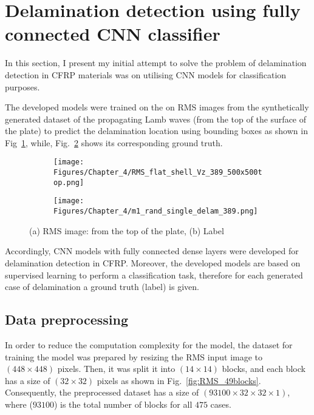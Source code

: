 \section{Delamination detection using fully connected CNN classifier}
\label{sec42}

In this section, I present my initial attempt to solve the problem of delamination detection in CFRP materials was on utilising CNN models for classification purposes.

The developed models were trained on the on RMS images from the synthetically generated dataset of the propagating Lamb waves (from the top of the surface of the plate) to predict the delamination location using bounding boxes as shown in Fig~\ref{fig:RMS_14}, while, Fig.~\ref{fig:label_14} shows its corresponding ground truth.
\begin{figure} [h!]
	\centering
	\begin{subfigure}[b]{0.47\textwidth}
		\centering
		\texttt{[image: Figures/Chapter\_4/RMS\_flat\_shell\_Vz\_389\_500x500top.png]}
		\caption{}
		\label{fig:RMS_14}
	\end{subfigure}
	\hfill
	\begin{subfigure}[b]{0.47\textwidth}
		\centering
		\texttt{[image: Figures/Chapter\_4/m1\_rand\_single\_delam\_389.png]}
		\caption{}
		\label{fig:label_14}
	\end{subfigure}
	\caption{(a) RMS image: from the top of the plate, (b) Label}
	\label{fig:RMS_GT}
\end{figure} 

Accordingly, CNN models with fully connected dense layers were developed for delamination detection in CFRP.
Moreover, the developed models are based on supervised learning to perform a classification task, therefore for each generated case of delamination a ground truth (label) is given.
 
\subsection{Data preprocessing}
In order to reduce the computation complexity for the model, the dataset for training the model was prepared by resizing the RMS input image to \((448\times 448)\) pixels.  
Then, it was split it into \((14\times 14)\) blocks, and each block has a size of \((32\times 32)\) pixels as shown in Fig.~\ref{fig:RMS_49blocks}.
Consequently, the preprocessed dataset has a size of \((93100\times 32\times 32 \times 1)\), where (\(93100\)) is the total number of blocks for all \(475\) cases.


